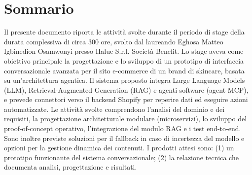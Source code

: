 \cleardoublepage
{}
{}
\begingroup
\let\clearpage\relax
\let\cleardoublepage\relax
\let\cleardoublepage\relax

\chapter*{Sommario}

Il presente documento riporta le attività svolte durante il periodo di stage della durata complessiva di circa 300 ore, svolto dal laureando Eghosa Matteo Igbinedion Osamwonyi presso Halue S.r.l. Società Benefit.  
Lo stage aveva come obiettivo principale la progettazione e lo sviluppo di un prototipo di interfaccia conversazionale avanzata per il sito e-commerce di un brand di skincare, basata su un'architettura agentica. Il sistema proposto integra Large Language Models (LLM), Retrieval-Augmented Generation (RAG) e agenti software (agent MCP), e prevede connettori verso il backend Shopify per reperire dati ed eseguire azioni automatizzate.  
Le attività svolte comprendono l'analisi del dominio e dei requisiti, la progettazione architetturale modulare (microservizi), lo sviluppo del proof-of-concept operativo, l'integrazione del modulo RAG e i test end-to-end. Sono inoltre previste soluzioni per il fallback in caso di incertezza del modello e opzioni per la gestione dinamica dei contenuti.  
I prodotti attesi sono: (1) un prototipo funzionante del sistema conversazionale; (2) la relazione tecnica che documenta analisi, progettazione e risultati.

\endgroup

\vfill
